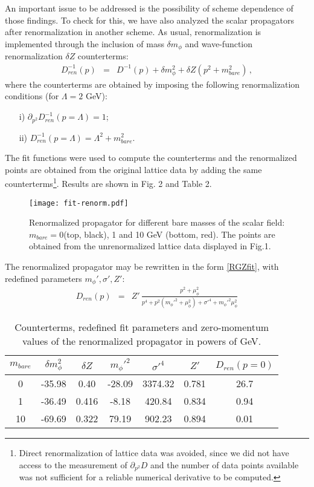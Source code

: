 An important issue to be addressed is the possibility of scheme dependence of those findings. To check for this, we have also analyzed the scalar propagators after renormalization in another scheme.
As usual, renormalization is implemented through the inclusion of mass $\delta m_{\phi}$ and wave-function renormalization $\delta Z $ counterterms:
\begin{eqnarray}
D_{ren}^{-1}(p)&=& D^{-1}(p) +\delta m_{\phi}^2 +\delta Z (p^2+m_{bare}^2)
\,,
\end{eqnarray}
%
%
where the counterterms are obtained by imposing the following renormalization conditions (for $\Lambda=2$ GeV):
\begin{enumerate}
	\item[i)] $\partial_{p^2}D_{ren}^{-1}(p=\Lambda)=1 $;
	\item[ii)] $D_{ren}^{-1}(p=\Lambda)=\Lambda^2+m_{bare}^2$.
\end{enumerate}
The fit functions were used to compute the counterterms and the renormalized points are obtained from the original lattice data by adding the same counterterms\footnote{Direct renormalization of lattice data was avoided, since we did not have access to the measurement of $\partial_{p^2}D$ and the number of data points available was not sufficient for a reliable numerical derivative to be computed.}. Results are shown in Fig. 2 and Table 2.


\begin{figure}[h!]
\center
\texttt{[image: fit-renorm.pdf]}
\caption{Renormalized propagator for different bare masses of the scalar field: $m_{bare}=0$(top, black), 1 and 10 GeV (bottom, red). The points are obtained from the unrenormalized lattice data  \cite{axel,Maas:2010nc} displayed in Fig.1.}
\end{figure}
%

The renormalized propagator may be rewritten in the form \eqref{RGZfit}, with redefined parameters $m_{\phi}',\sigma',Z'$:
\begin{eqnarray}
D_{ren}(p)&=&
Z'\, \frac{p^2+\mu_{\phi}^2}{p^4+p^2(m_{\phi}'^2+\mu_{\phi}^2)+\sigma'^4+m_{\phi}'^2\mu_{\phi}^2}
\end{eqnarray}    
    
        \begin{table}[ht]
 \caption{Counterterms, redefined fit parameters and zero-momentum values of the renormalized propagator in powers of GeV.}
 \vspace{0.3cm}
  \centering
   \begin{tabular}{c ||c| c|| c| c|c||c}
    $m_{bare}$ & $\delta m_{\phi}^2$ & $\delta Z$& $m_{\phi}'^2$ & $\sigma'^4$ & $Z'$& $D_{ren}(p=0)$\\
   \hline\hline 
    0 & -35.98    & 0.40 & -28.09 & 3374.32 & 0.781&26.7\\
      \hline 
    1 & -36.49 & 0.416 & -8.18  & 420.84 & 0.834 &0.94\\
      \hline 
    10 &  -69.69    & 0.322 & 79.19 & 902.23 & 0.894 &0.01
     \end{tabular}
     \label{table:CT} 
    \end{table}



